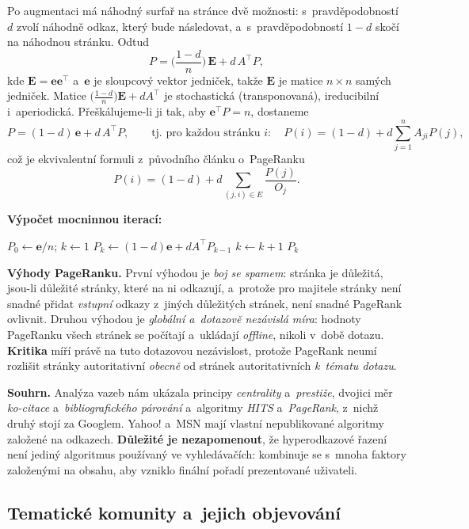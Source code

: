 \documentclass[11pt,a4paper]{article}
\theoremstyle{definition}
\begin{document}
\begin{defbox}
Po augmentaci má náhodný surfař na stránce dvě možnosti: s~pravděpodobností $d$ zvolí náhodně
odkaz, který bude následovat, a~s~pravděpodobností $1-d$ skočí na náhodnou stránku. Odtud
\[ P=\Big(\frac{1-d}{n}\Big)\,\mathbf{E}+d\,A^{\!\top}P, \]
kde $\mathbf E=\mathbf{ee}^{\!\top}$ a~$\mathbf e$ je sloupcový vektor jedniček, takže
$\mathbf E$ je matice $n\times n$ samých jedniček. Matice
$\big(\frac{1-d}{n}\big)\mathbf E+dA^{\!\top}$ je stochastická (transponovaná), ireducibilní
i~aperiodická. Přeškálujeme-li ji tak, aby $\mathbf e^{\!\top}P=n$, dostaneme
\[ P=(1-d)\,\mathbf e+d\,A^{\!\top}P,\qquad\text{tj.\ pro každou stránku } i: \quad
   P(i)=(1-d)+d\sum_{j=1}^{n}A_{ji}P(j), \]
což je ekvivalentní formuli z~původního článku o~PageRanku
\[ P(i)=(1-d)+d\sum_{(j,i)\in E}\frac{P(j)}{O_j}. \]

\textbf{Výpočet mocninnou iterací:}
\begin{algorithmic}[1]
\State $P_0\gets \mathbf e/n$; $k\gets 1$
\Repeat
  \State $P_k\gets (1-d)\mathbf e+dA^{\!\top}P_{k-1}$
  \State $k\gets k+1$
\State \Return $P_k$
\end{algorithmic}
\end{defbox}

\textbf{Výhody PageRanku.} První výhodou je \emph{boj se spamem}: stránka je důležitá, jsou-li
důležité stránky, které na ni odkazují, a~protože pro majitele stránky není snadné přidat
\emph{vstupní} odkazy z~jiných důležitých stránek, není snadné PageRank ovlivnit. Druhou
výhodou je \emph{globální a~dotazově nezávislá míra}: hodnoty PageRanku všech stránek se
počítají a~ukládají \emph{offline}, nikoli v~době dotazu. \textbf{Kritika} míří
právě na tuto dotazovou nezávislost, protože PageRank neumí rozlišit stránky autoritativní
\emph{obecně} od stránek autoritativních \emph{k~tématu dotazu}.

\textbf{Souhrn.} Analýza vazeb nám ukázala principy \emph{centrality} a~\emph{prestiže}, dvojici
měr \emph{ko-citace} a~\emph{bibliografického párování} a~algoritmy \emph{HITS} a~\emph{PageRank},
z~nichž druhý stojí za Googlem. Yahoo! a~MSN mají vlastní nepublikované algoritmy založené na
odkazech. \textbf{Důležité je nezapomenout}, že hyperodkazové řazení není jediný algoritmus
používaný ve vyhledávačích: kombinuje se s~mnoha faktory založenými na obsahu, aby vzniklo
finální pořadí prezentované uživateli.

\subsection{Tematické komunity a~jejich objevování}
\end{document}
